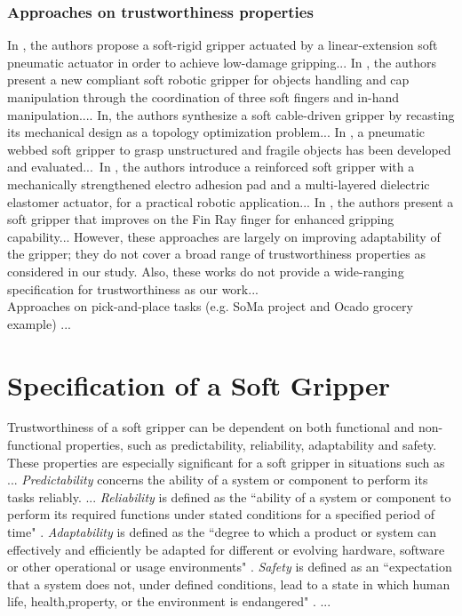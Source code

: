 \documentclass[lettersize,journal]{IEEEtran}
\begin{document}
\subsubsection{Approaches on trustworthiness properties}
In \cite{Cheng2021}, the authors propose a soft-rigid gripper actuated by a linear-extension soft pneumatic actuator in order to achieve low-damage gripping... In \cite{Liu2021}, the authors present a new compliant soft robotic gripper for objects handling and cap manipulation through the coordination of three soft fingers and in-hand manipulation.... In\cite{Chen2018}, the authors synthesize a soft cable-driven gripper by recasting its mechanical design as a topology optimization problem... In \cite{Cai2021}, a pneumatic webbed soft gripper to grasp unstructured and fragile objects has been developed and evaluated... In \cite{Hwang2020}, the authors introduce a reinforced soft gripper with a mechanically strengthened electro adhesion pad and a multi-layered dielectric elastomer actuator, for a practical robotic application... In \cite{Shin2021}, the authors present a soft gripper that improves on the Fin Ray finger for enhanced gripping capability... However, these approaches are largely on improving adaptability of the gripper; they do not cover a broad range of trustworthiness properties as considered in our study. Also, these works do not provide a wide-ranging specification for trustworthiness as our work...\\

Approaches on pick-and-place tasks (e.g. SoMa project and Ocado grocery example) \cite{Negrello2020,Triantafyllou2019,Sotiropoulos2018, Pozzi2016,Bianchi2018}...

\section{Specification of a Soft Gripper}\label{specification-gripper}
Trustworthiness of a soft gripper can be dependent on both functional and non-functional properties, such as predictability, reliability, adaptability and safety. 
These properties are especially significant for a soft gripper in situations such as ...
\emph{Predictability} concerns the ability of a system or component to perform its tasks reliably. ...
\emph{Reliability} is defined as the ``ability of a system or component to perform its required functions under stated conditions for a specified period of time" \cite{ISO24765:2017}. 
\emph{Adaptability} is defined as the ``degree to which a product or system can effectively and efficiently be adapted for different or evolving hardware, software or other operational or usage environments" \cite{ISO24765:2017}. 
\emph{Safety} is defined as an ``expectation that a system does not, under defined conditions, lead to a state in which human life, health,property, or the environment is endangered" \cite{ISO24765:2017}.
...
\end{document}
